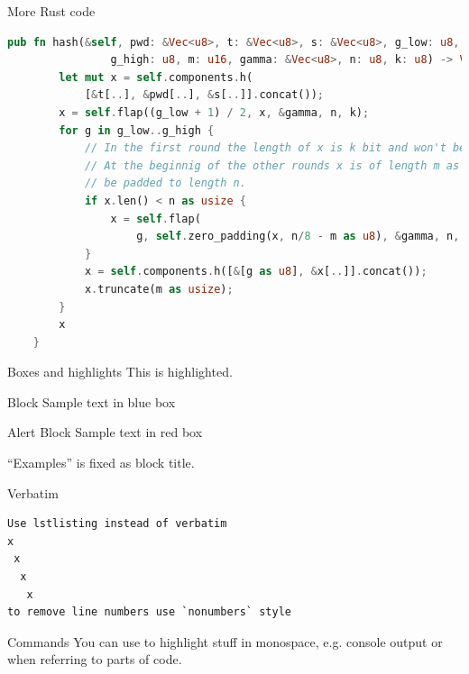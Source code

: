 \begin{frame}[fragile]{More Rust code}
  \begin{lstlisting}[autogobble, basicstyle=\scriptsize, language=Rust]
    pub fn hash(&self, pwd: &Vec<u8>, t: &Vec<u8>, s: &Vec<u8>, g_low: u8,
                g_high: u8, m: u16, gamma: &Vec<u8>, n: u8, k: u8) -> Vec<u8> {
        let mut x = self.components.h(
            [&t[..], &pwd[..], &s[..]].concat());
        x = self.flap((g_low + 1) / 2, x, &gamma, n, k);
        for g in g_low..g_high {
            // In the first round the length of x is k bit and won't be padded.
            // At the beginnig of the other rounds x is of length m as has to
            // be padded to length n.
            if x.len() < n as usize {
                x = self.flap(
                    g, self.zero_padding(x, n/8 - m as u8), &gamma, n, k);
            }
            x = self.components.h([&[g as u8], &x[..]].concat());
            x.truncate(m as usize);
        }
        x
    }
  \end{lstlisting}
\end{frame}

\begin{frame}{Boxes and highlights}
This is \alert{highlighted}.
\begin{block}{Block}
Sample text in blue box
\end{block}
\begin{alertblock}{Alert Block}
Sample text in red box
\end{alertblock}
\begin{examples}
``Examples'' is fixed as block title.
\end{examples}
\end{frame}

\begin{frame}[fragile]{Verbatim}
\begin{lstlisting}[style=nonumbers]
Use lstlisting instead of verbatim
x
 x
  x
   x
to remove line numbers use `nonumbers` style
\end{lstlisting}
\end{frame}

\begin{frame}{Commands}
  You can use  to highlight stuff in monospace, e.g.
  console output or when referring to parts of code.
\end{frame}

